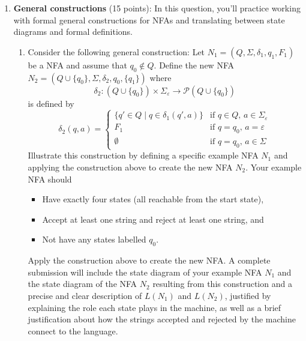 \begin{enumerate}[wide, labelwidth=!, labelindent=0pt]
\begin{enumerate}
\item\gradeCorrect Design a NFA with at most $6$ states that recognizes the language
\[ 
\{w \in \{a,b\}^* \mid w \text{ contains at most one $a$ {\bf or} at least two $b$s}\}
\]
A complete solution will include the state diagram of your NFA and 
    a brief justification 
    of your construction by explaining the role each state plays in the machine, as well as a brief 
    justification about how the strings accepted and rejected by the machine connect to the specified language.
    Give one example string in the language and explain the computation of the NFA
    that witnesses that the machine accepts this string.
    Also, give one example string not in the language and explain why the NFA rejects this string.
\end{enumerate}
{\it Bonus extension to think about (ungraded):} Did you need all $6$ states? Could you design DFA with $6$ states that recognize
each of these langauges?

\item\textbf{General constructions} (15 points):
In this question, you'll practice working with formal general constructions
for NFAs and translating between state diagrams and formal definitions.

\begin{enumerate}
\item\gradeCorrect Consider the following general construction: Let $N_1 = (Q, \Sigma, \delta_1, q_1, F_1)$ be a NFA
and assume that $q_0 \notin Q$.
Define the new NFA $N_2 = (Q \cup \{q_0\}, \Sigma, \delta_2, q_0, \{q_1\})$ where 
$$\delta_2: (Q \cup \{q_0\}) \times \Sigma_\varepsilon \to \mathcal{P} (Q \cup \{q_0\})$$ is defined by
\[
    \delta_2 (q,a) = \begin{cases}
        \{ q' \in Q \mid q \in \delta_1(q',a)\} &\text{if $q \in Q$, $a \in \Sigma_{\varepsilon}$} \\
        F_1 &\text{if $q =q_0$, $a = \varepsilon$}\\
        \emptyset &\text{if $q = q_0$, $a \in \Sigma$}
    \end{cases}
\]
Illustrate this construction by defining a specific example NFA $N_1$ and applying the 
construction above to create the new NFA $N_2$. Your example NFA should
\begin{itemize}
    \item Have exactly four states (all reachable from the start state),
    \item Accept at least one string and reject at least one string, and
    \item Not have any states labelled $q_0$.
\end{itemize}
Apply the construction above to create the new NFA. A complete submission 
will include the state diagram of your example NFA $N_1$ and the state diagram of the NFA $N_2$ resulting 
from this construction and a precise and clear description of $L(N_1)$ and $L(N_2)$, justified
by explaining the role each state plays in the machine, as well as a brief 
justification about how the strings accepted and rejected by the machine connect to the language.


\end{enumerate}
\end{enumerate}
